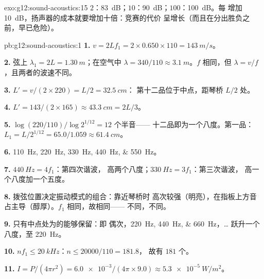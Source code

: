 \begin{solution}{exo:g12:sound-acoustics:15}
$2$：\qty{83}{dB}；$10$：\qty{90}{dB}；$100$：\qty{100}{dB}。每
增加 \qty{+10}{dB}，扬声器的成本就要增加十倍：竞赛的代价
呈增长（而且在分出胜负之前，早已危险）。
\end{solution}

\begin{solution}{pb:g12:sound-acoustics:1}
\textbf{1.} $v = 2Lf_1 = 2 \times 0.650 \times 110 = \qty{143}{m/s}$。

\textbf{2.} 弦上 $\lambda_1 = 2L = \qty{1.30}{m}$；在空气中
$\lambda = 340/110 \approx \qty{3.1}{m}$。$f$ 相同，但
$\lambda = v/f$，且两者的波速不同。

\textbf{3.} $L' = v/(2 \times 220) = L/2 = \qty{32.5}{cm}$：
第十二品位于中点，距琴桥 $L/2$ 处。

\textbf{4.} $L' = 143/(2 \times 165) \approx \qty{43.3}{cm} = 2L/3$。

\textbf{5.} $\log(220/110)/\log 2^{1/12} = 12$ 个半音——
十二品即为一个八度。第一品：$L_1 = L/2^{1/12} = 65.0/1.059
\approx \qty{61.4}{cm}$。

\textbf{6.} \qtylist{110;220;330;440;550}{Hz}。

\textbf{7.} $\qty{440}{Hz} = 4f_1$：第四次谐波，
高两个八度；$\qty{330}{Hz} = 3f_1$：第三次谐波，
高一个八度加一个五度。

\textbf{8.} 拨弦位置决定振动模式的组合：靠近琴桥时
高次较强（明亮），在指板上方音占主导（醇厚）。$f_1$ 相同，故相同——
不同，不同。

\textbf{9.} 只有中点处为的能够保留：即
偶次，\qtylist{220;440;660}{Hz}，\dots {}
跃升一个八度，至 \qty{220}{Hz}。

\textbf{10.} $nf_1 \le \qty{20}{kHz}$：$n \le 20000/110 = 181.8$，
故有 $181$ 个。

\textbf{11.} $I = P/(4\pi r^2) = \num{6.0e-3}/(4\pi \times 9.0)
\approx \qty{5.3e-5}{W/m^2}$。


\end{solution}
